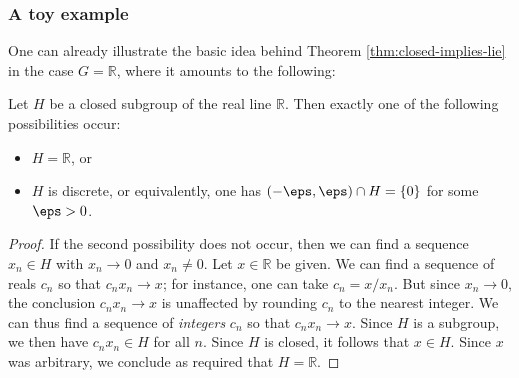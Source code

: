 \documentclass[reqno]{amsart} 
\begin{document}
\subsubsection{A toy example}
\label{sec:org3cf56ab}
One can already illustrate the basic idea behind Theorem \ref{thm:closed-implies-lie} in the case $G = \mathbb{R}$, where it amounts to the following:
\begin{theorem}
  Let $H$ be a closed subgroup of the real line $\mathbb{R}$.  Then exactly one of the following possibilities occur:
  \begin{itemize}
  \item $H = \mathbb{R}$, or
  \item $H$ is discrete, or equivalently, one has $(-\eps,\eps) \cap H = \{0\}$ for some $\eps > 0$.
  \end{itemize}
\end{theorem}
\begin{proof}
  If the second possibility does not occur, then we can find a sequence $x_n \in H$ with $x_n \rightarrow 0$ and $x_n \neq 0$.  Let $x \in \mathbb{R}$ be given.  We can find a sequence of reals $c_n$ so that $c_n x_n \rightarrow x$; for instance, one can take $c_n = x/x_n$.  But since $x_n \rightarrow 0$, the conclusion $c_n x_n \rightarrow x$ is unaffected by rounding $c_n$ to the nearest integer.  We can thus find a sequence of \emph{integers} $c_n$ so that $c_n x_n \rightarrow x$.  Since $H$ is a subgroup, we then have $c_n x_n \in H$ for all $n$.  Since $H$ is closed, it follows that $x \in H$.  Since $x$ was arbitrary, we conclude as required that $H = \mathbb{R}$.
\end{proof}
\end{document}
